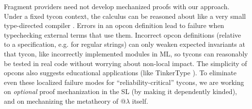 \documentclass[10pt,preprint]{sigplanconf}
\begin{document}
Fragment providers need not develop mechanized proofs with our approach. Under a fixed tycon context, the calculus can be reasoned about like a very small type-directed compiler \cite{tarditi+:til-OLD,conf/pldi/Chlipala07}. Errors in an opcon definition lead to failure when typechecking external terms that use them. Incorrect opcon definitions (relative to a specification, e.g. \cite{fulton-thesis} for regular strings) can only weaken expected invariants at that tycon, like incorrectly implemented modules in ML, so tycons can reasonably be tested in real code without worrying about non-local impact. The simplicity of opcons also suggests educational applications (like TinkerType \cite{LevinPierce99}).  
To eliminate even these localized failure modes for ``reliability-critical'' tycons, we are working on \emph{optional} proof mechanization in the SL (by making it dependently kinded), and on mechanizing the metatheory of @$\lambda$ itself.%
\end{document}
